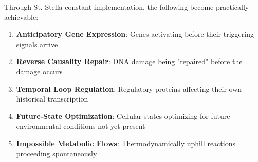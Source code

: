 \documentclass[12pt,a4paper]{article}
\begin{document}
Through St. Stella constant implementation, the following become practically achievable:

\begin{enumerate}
\item \textbf{Anticipatory Gene Expression}: Genes activating before their triggering signals arrive
\item \textbf{Reverse Causality Repair}: DNA damage being "repaired" before the damage occurs
\item \textbf{Temporal Loop Regulation}: Regulatory proteins affecting their own historical transcription
\item \textbf{Future-State Optimization}: Cellular states optimizing for future environmental conditions not yet present
\item \textbf{Impossible Metabolic Flows}: Thermodynamically uphill reactions proceeding spontaneously
\end{enumerate}
\end{document}
